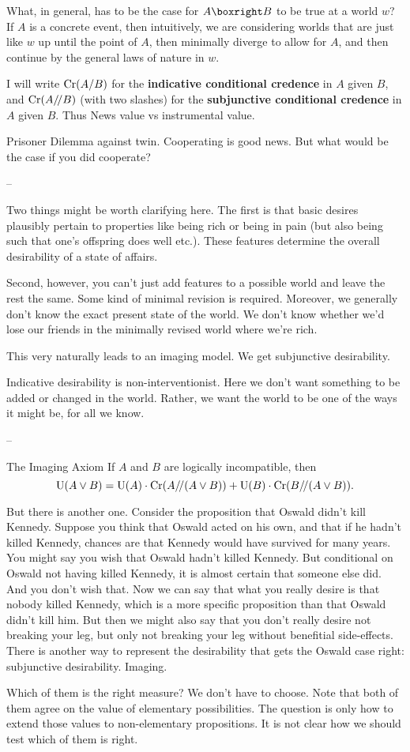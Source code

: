{What, in general, has to be the case for $A \boxright B$ to be true at a world
$w$? If $A$ is a concrete event, then intuitively, we are considering worlds
that are just like $w$ up until the point of $A$, then minimally diverge to
allow for $A$, and then continue by the general laws of nature in $w$.

I will write $\text{Cr}(A/B)$ for the \textbf{indicative conditional credence} in $A$
given $B$, and $\text{Cr}(A/\!/B)$ (with two slashes) for the \textbf{subjunctive
  conditional credence} in $A$ given $B$. Thus News value vs instrumental value.

Prisoner Dilemma against twin. Cooperating is good news. But what would be the
case if you did cooperate?

--

Two things might be worth clarifying here. The first is that basic desires
plausibly pertain to properties like being rich or being in pain (but also being
such that one's offspring does well etc.). These features determine the overall
desirability of a state of affairs.

Second, however, you can't just add features to a possible world and leave the
rest the same. Some kind of minimal revision is required. Moreover, we generally
don't know the exact present state of the world. We don't know whether we'd lose
our friends in the minimally revised world where we're rich.

This very naturally leads to an imaging model. We get subjunctive desirability.

Indicative desirability is non-interventionist. Here we don't want something to
be added or changed in the world. Rather, we want the world to be one of the
ways it might be, for all we know.

--

\begin{genericthm}{The Imaging Axiom}
  If $A$ and $B$ are logically incompatible, then 
  \[ \text{U}(A \lor B) = \text{U}(A)\cdot \text{Cr}(A/\!/(A\lor B)) + \text{U}(B)\cdot \text{Cr}(B/\!/(A \lor B)). \]
\end{genericthm}

But there is another one. Consider the proposition that Oswald didn't kill
Kennedy. Suppose you think that Oswald acted on his own, and that if he hadn't
killed Kennedy, chances are that Kennedy would have survived for many years. You
might say you wish that Oswald hadn't killed Kennedy. But conditional on Oswald
not having killed Kennedy, it is almost certain that someone else did. And you
don't wish that. Now we can say that what you really desire is that nobody
killed Kennedy, which is a more specific proposition than that Oswald didn't
kill him. But then we might also say that you don't really desire not breaking
your leg, but only not breaking your leg without benefitial side-effects. There
is another way to represent the desirability that gets the Oswald case right:
subjunctive desirability. Imaging.

Which of them is the right measure? We don't have to choose. Note that both of
them agree on the value of elementary possibilities. The question is only how to
extend those values to non-elementary propositions. It is not clear how we
should test which of them is right.

} %

